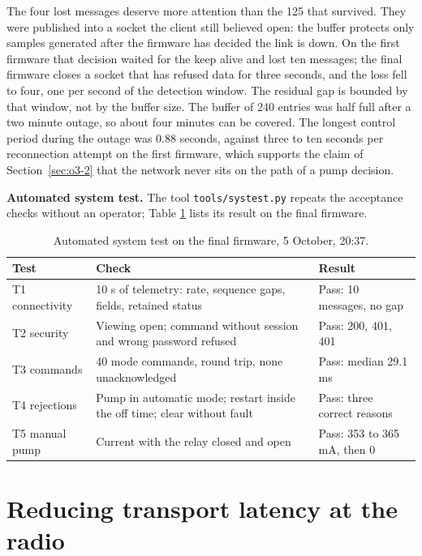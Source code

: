 The four lost messages deserve more attention than the 125 that survived. They were published into a socket the client still believed open: the buffer protects only samples generated after the firmware has decided the link is down. On the first firmware that decision waited for the keep alive and lost ten messages; the final firmware closes a socket that has refused data for three seconds, and the loss fell to four, one per second of the detection window. The residual gap is bounded by that window, not by the buffer size. The buffer of 240 entries was half full after a two minute outage, so about four minutes can be covered. The longest control period during the outage was 0.88 seconds, against three to ten seconds per reconnection attempt on the first firmware, which supports the claim of Section~\ref{sec:o3-2} that the network never sits on the path of a pump decision.

\textbf{Automated system test.} The tool \texttt{tools/systest.py} repeats the acceptance checks without an operator; Table \ref{tab:systest} lists its result on the final firmware.

\begin{table}[H]
\caption{Automated system test on the final firmware, 5 October, 20:37.}
\label{tab:systest}
\centering
\renewcommand{\arraystretch}{1.05}
\begin{tabular}{|p{3.4cm}|p{6.2cm}|p{3.0cm}|}
\hline
\textbf{Test} & \textbf{Check} & \textbf{Result} \\
\hline
T1 connectivity & 10 s of telemetry: rate, sequence gaps, fields, retained status & Pass: 10 messages, no gap \\ \hline
T2 security & Viewing open; command without session and wrong password refused & Pass: 200, 401, 401 \\ \hline
T3 commands & 40 mode commands, round trip, none unacknowledged & Pass: median 29.1 ms \\ \hline
T4 rejections & Pump in automatic mode; restart inside the off time; clear without fault & Pass: three correct reasons \\ \hline
T5 manual pump & Current with the relay closed and open & Pass: 353 to 365 mA, then 0 \\ \hline
\end{tabular}
\end{table}

\section{Reducing transport latency at the radio}
\label{sec:o8-6}

